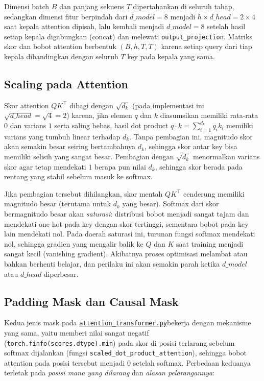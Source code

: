 \documentclass[12pt,a4paper]{article}
\newcommand{\code}[1]{\texttt{\small #1}}
\newcommand{\sourcecodelink}{\href{https://github.com/Universitas-Cakrawala/tugas-deep-learning-sesi-10/blob/main/attention_transformer.py}{\nolinkurl{attention_transformer.py}}}
\begin{document}
Dimensi batch $B$ dan panjang sekuens $T$ dipertahankan di seluruh tahap,
sedangkan dimensi fitur berpindah dari $d\_model=8$ menjadi $h \times
d\_head = 2 \times 4$ saat kepala attention dipisah, lalu kembali menjadi
$d\_model=8$ setelah hasil setiap kepala digabungkan (concat) dan melewati
\code{output\_projection}. Matriks skor dan bobot attention berbentuk
$(B, h, T, T)$ karena setiap query dari tiap kepala dibandingkan dengan
seluruh $T$ key pada kepala yang sama.

\subsection{Scaling pada Attention}
Skor attention $QK^\top$ dibagi dengan $\sqrt{d_k}$ (pada implementasi ini
$\sqrt{d\_head} = \sqrt{4} = 2$) karena, jika elemen $q$ dan $k$ diasumsikan
memiliki rata-rata $0$ dan varians $1$ serta saling bebas, hasil dot product
$q \cdot k = \sum_{i=1}^{d_k} q_i k_i$ memiliki varians yang tumbuh linear
terhadap $d_k$. Tanpa pembagian ini, magnitudo skor akan semakin besar
seiring bertambahnya $d_k$, sehingga skor antar key bisa memiliki selisih
yang sangat besar. Pembagian dengan $\sqrt{d_k}$ menormalkan varians skor
agar tetap mendekati $1$ berapa pun nilai $d_k$, sehingga skor berada pada
rentang yang stabil sebelum masuk ke softmax.

Jika pembagian tersebut dihilangkan, skor mentah $QK^\top$ cenderung memiliki
magnitudo besar (terutama untuk $d_k$ yang besar). Softmax dari skor bermagnitudo
besar akan \emph{saturasi}: distribusi bobot menjadi sangat tajam dan mendekati
one-hot pada key dengan skor tertinggi, sementara bobot pada key lain mendekati
nol. Pada daerah saturasi ini, turunan fungsi softmax mendekati nol, sehingga
gradien yang mengalir balik ke $Q$ dan $K$ saat training menjadi sangat kecil
(vanishing gradient). Akibatnya proses optimisasi melambat atau bahkan
berhenti belajar, dan perilaku ini akan semakin parah ketika $d\_model$
atau $d\_head$ diperbesar.

\subsection{Padding Mask dan Causal Mask}
Kedua jenis mask pada \sourcecodelink bekerja dengan
mekanisme yang sama, yaitu memberi nilai sangat negatif
(\code{torch.finfo(scores.dtype).min}) pada skor di posisi terlarang sebelum
softmax dijalankan (fungsi \code{scaled\_dot\_product\_attention}), sehingga
bobot attention pada posisi tersebut menjadi $0$ setelah softmax. Perbedaan
keduanya terletak pada \emph{posisi mana yang dilarang} dan \emph{alasan
pelarangannya}:
\end{document}
